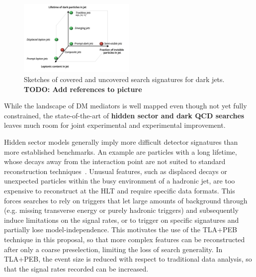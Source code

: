 \begin{figure} 
\begin{center}
\includegraphics[width=0.5\textwidth]{figs_B2/DarkSectorSketch}
\caption{Sketches of covered and uncovered search signatures for dark jets. \color{red}\textbf{TODO: Add references to picture}\color{black}
\label{fig:darksectorssketch} }
\end{center}
\end{figure}
\vskip-10pt

 
While the landscape of DM mediators is well mapped even though not yet fully constrained, 
the state-of-the-art of \textbf{hidden sector and dark QCD searches} leaves much room for joint experimental and experimental improvement.

Hidden sector models generally imply more difficult detector signatures than more established benchmarks. 
An example are particles with a long lifetime, whose decays away from the interaction point are not suited to standard reconstruction techniques~\cite{ToBeCited}.
Unusual features, such as displaced decays or unexpected particles within the busy environment of a hadronic jet, are too expensive to reconstruct at the HLT and require specific data formats. %
This forces searches to rely on triggers that let large amounts of background through (e.g. missing transverse energy or purely hadronic triggers) and subsequently induce limitations on the signal rates, or to trigger on specific signatures and partially lose model-independence. 
This motivates the use of the TLA+PEB technique in this proposal, so that more complex features can be reconstructed after only a coarse preselection, limiting the loss of search generality. In TLA+PEB, the event size is reduced with respect to traditional data analysis, so that the signal rates recorded can be increased. 


